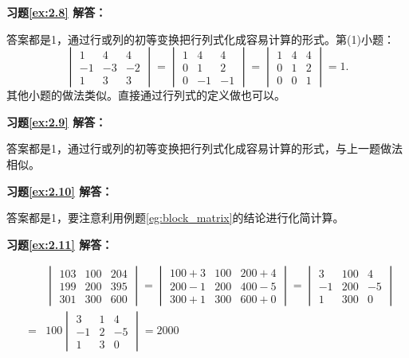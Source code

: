 \documentclass[a4paper]{book}
\begin{document}
\vspace{1.5em}

\textbf{习题\ref{ex:2.8} 解答：}

答案都是1，通过行或列的初等变换把行列式化成容易计算的形式。第(1)小题：
$$\begin{vmatrix} 1 & 4 & 4 \\ -1 & -3 & -2 \\ 1 & 3 & 3 \end{vmatrix} = \begin{vmatrix} 1 & 4 & 4 \\ 0 & 1 & 2 \\ 0 & -1 & -1 \end{vmatrix} = \begin{vmatrix} 1 & 4 & 4 \\ 0 & 1 & 2 \\ 0 & 0 & 1 \end{vmatrix} = 1.$$
其他小题的做法类似。直接通过行列式的定义做也可以。

\vspace{1.5em}

\textbf{习题\ref{ex:2.9} 解答：}

答案都是1，通过行或列的初等变换把行列式化成容易计算的形式，与上一题做法相似。

\vspace{1.5em}

\textbf{习题\ref{ex:2.10} 解答：}

答案都是1，要注意利用例题\ref{eg:block_matrix}的结论进行化简计算。

\vspace{1.5em}

\textbf{习题\ref{ex:2.11} 解答：}

\begin{eqnarray*}
& & \begin{vmatrix} 103 & 100 & 204 \\ 199 & 200 & 395 \\ 301 & 300 & 600 \end{vmatrix}
=\begin{vmatrix} 100+3 & 100 & 200+4 \\ 200-1 & 200 & 400-5 \\ 300+1 & 300 & 600+0 \end{vmatrix} = \begin{vmatrix} 3 & 100 & 4 \\ -1 & 200 & -5 \\ 1 & 300 & 0 \end{vmatrix} \\
& = & 100\begin{vmatrix} 3 & 1 & 4 \\ -1 & 2 & -5 \\ 1 & 3 & 0 \end{vmatrix} = 2000
\end{eqnarray*}
\end{document}

